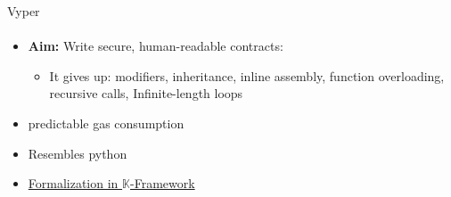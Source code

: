 \begin{frame}{Vyper}
\framesubtitle{\cite{bib:vyper-docs}}

  \begin{itemize}
  	\item \textbf{Aim:} Write secure, human-readable  contracts:
  	\begin{itemize}
  		\item It gives up: modifiers, inheritance, inline assembly, function overloading, recursive calls, Infinite-length loops
  	\end{itemize}
    \item predictable gas consumption
    \item Resembles python
  	\item \href{https://github.com/kframework/vyper-semantics/}{Formalization in $\mathbb{K}$-Framework}
  \end{itemize}

\end{frame}
